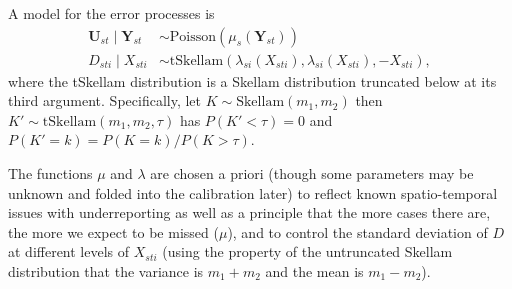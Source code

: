 \documentclass[a4paper]{article}
\newcommand{\bY}{\bm{Y}}
\newcommand{\bU}{\bm{U}}
\begin{document}
A model for the error processes is
\begin{align}
\bU_{st}\mid\bY_{st} &\sim \mathrm{Poisson}(\mu_s(\bY_{st})) \\
D_{sti}\mid X_{sti} &\sim \mathrm{tSkellam}(\lambda_{si}(X_{sti}), \lambda_{si}(X_{sti}), -X_{sti}),
\end{align}
where the tSkellam distribution is a Skellam distribution truncated below at its third argument. Specifically, let $K \sim \mathrm{Skellam}(m_1, m_2)$ then $K' \sim \mathrm{tSkellam}(m_1, m_2, \tau)$ has $P(K' < \tau) = 0$ and $P(K' = k) = P(K=k)/P(K>\tau)$.

The functions $\mu$ and $\lambda$ are chosen a priori (though some parameters may be unknown and folded into the calibration later) to reflect known spatio-temporal issues with underreporting as well as a principle that the more cases there are, the more we expect to be missed ($\mu$), and to control the standard deviation of $D$ at different levels of $X_{sti}$ (using the property of the untruncated Skellam distribution that the variance is $m_1+m_2$ and the mean is $m_1-m_2$).
\end{document}
